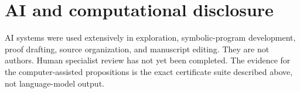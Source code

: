 \documentclass[11pt,reqno]{amsart}
\begin{document}
\appendix



\section*{AI and computational disclosure}

AI systems were used extensively in exploration, symbolic-program
development, proof drafting, source organization, and manuscript editing.
They are not authors.  Human specialist review has not yet been completed.
The evidence for the computer-assisted propositions is the exact certificate
suite described above, not language-model output.



\end{document}
